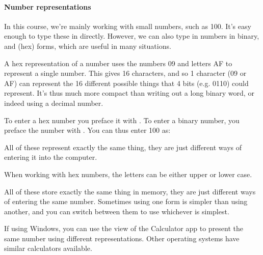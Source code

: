 \documentclass[letterpaper,10pt,british]{sphinxmanual}
\let\sphinxpxdimen\pdfpxdimen\else\newdimen\sphinxpxdimen
\begin{document}
\paragraph{Number representations}
\label{\detokenize{chapters/programming_fundamentals/integers:number-representations}}
\sphinxAtStartPar
In this course, we’re mainly working with small numbers, such as 100. It’s easy enough to type these in directly. However, we can also type in numbers in binary, and  (hex) forms, which are useful in many situations.

\sphinxAtStartPar
A hex representation of a number uses the numbers 0\sphinxhyphen{}9 and letters A\sphinxhyphen{}F to represent a single number. This gives 16 characters, and so 1 character (0\sphinxhyphen{}9 or A\sphinxhyphen{}F) can represent the 16 different possible things that 4 bits (e.g. 0110) could represent. It’s thus much more compact than writing out a long binary word, or indeed using a decimal number.

\sphinxAtStartPar
To enter a hex number you preface it with . To enter a binary number, you preface the number with . You can thus enter 100 as:

\begin{sphinxVerbatim}[commandchars=\\\{\}]
  
  
  
\end{sphinxVerbatim}

\sphinxAtStartPar
All of these represent exactly the same thing, they are just different ways of entering it into the computer.

\sphinxAtStartPar
When working with hex numbers, the letters can be either upper or lower case.

\sphinxAtStartPar
All of these store exactly the same thing in memory, they are just different ways of entering the same number. Sometimes using one form is simpler than using another, and you can switch between them to use whichever is simplest.

\sphinxAtStartPar
If using Windows, you can use the  view of the Calculator app to present the same number using different representations. Other operating systems have similar calculators available.

\begin{figure}[htbp]
\centering

\noindent\sphinxincludegraphics[width=600\sphinxpxdimen]{{calculator}.png}
\end{figure}
\end{document}
